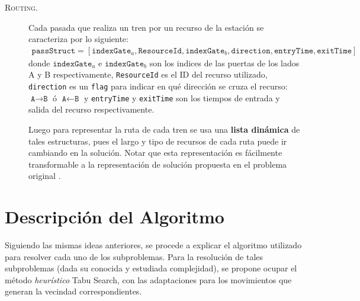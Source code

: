 \documentclass[letter, 10pt]{article}
\begin{document}
\begin{description}
    \item[\textsc{Routing.}] Cada pasada que realiza un tren por un recurso de la estación se caracteriza por lo siguiente:
    \begin{align*}
        \texttt{passStruct} = [\texttt{indexGate}_a, \texttt{ResourceId}, \texttt{indexGate}_b, \texttt{direction}, \texttt{entryTime}, \texttt{exitTime}]
    \end{align*}
    donde $\texttt{indexGate}_a$ e $\texttt{indexGate}_b$ son los indices de las puertas de los lados A y B respectivamente, \texttt{ResourceId} es el ID del recurso utilizado,  \texttt{direction} es un \texttt{flag} para indicar en qué dirección se cruza el recurso: $\texttt{A}\rightarrow \texttt{B}$ ó $\texttt{A}\leftarrow \texttt{B}$ y \texttt{entryTime} y \texttt{exitTime} son los tiempos de entrada y salida del recurso respectivamente.

    Luego para representar la ruta de cada tren se usa una \textbf{lista dinámica} de tales estructuras, pues el largo y tipo de recursos de cada ruta puede ir cambiando en la solución. Notar que esta representación es fácilmente transformable a la representación de solución propuesta en el problema original \cite{Problem}.
\end{description}

\section{Descripción del Algoritmo}

Siguiendo las mismas ideas anteriores, se procede a explicar el algoritmo utilizado para resolver cada uno de los subproblemas. Para la resolución de tales subproblemas (dada su conocida y estudiada complejidad), se propone ocupar el método \textit{heurístico} Tabu Search, con las adaptaciones para los movimientos que generan la vecindad correspondientes.
\end{document}
